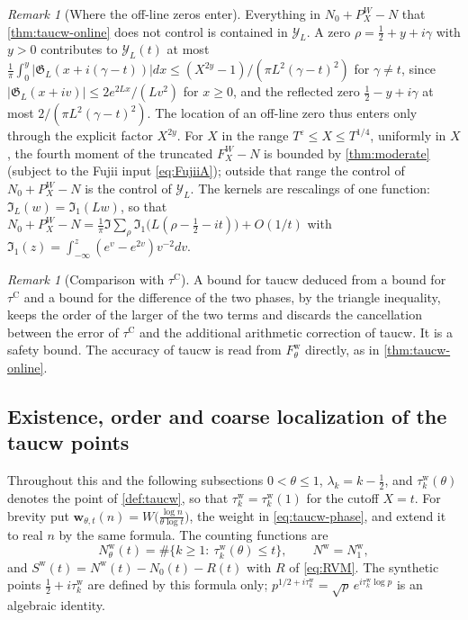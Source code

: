 \documentclass[11pt,a4paper]{article}
\numberwithin{equation}{section}
\theoremstyle{definition}
\theoremstyle{remark}
\newtheorem{remark}[theorem]{Remark}
\begin{document}
\begin{remark}[Where the off-line zeros enter]\label{rem:taucw-off}
Everything in $N_0+P^W_X-N$ that \cref{thm:taucw-online} does not control is contained in $\mathcal Y_L$. A zero $\rho=\frac12+y+i\gamma$ with $y>0$ contributes to $\mathcal Y_L(t)$ at most $\frac1\pi\int_0^y|\mathfrak G_L(x+i(\gamma-t))|dx\le(X^{2y}-1)/(\pi L^2(\gamma-t)^2)$ for $\gamma\ne t$, since $|\mathfrak G_L(x+iv)|\le2e^{2Lx}/(Lv^2)$ for $x\ge0$, and the reflected zero $\frac12-y+i\gamma$ at most $2/(\pi L^2(\gamma-t)^2)$. The location of an off-line zero thus enters only through the explicit factor $X^{2y}$. For $X$ in the range $T^\varepsilon\le X\le T^{1/4}$, uniformly in $X$, the fourth moment of the truncated $F_X^W-N$ is bounded by \cref{thm:moderate} (subject to the Fujii input \eqref{eq:FujiiA}); outside that range the control of $N_0+P^W_X-N$ is the control of $\mathcal Y_L$. The kernels are rescalings of one function: $\mathfrak I_L(w)=\mathfrak I_1(Lw)$, so that $N_0+P^W_X-N=\frac1\pi\Im\sum_\rho\mathfrak I_1\bigl(L(\rho-\frac12-it)\bigr)+O(1/t)$ with $\mathfrak I_1(z)=\int_{-\infty}^z(e^v-e^{2v})v^{-2}dv$.
\end{remark}

\begin{remark}[Comparison with $\tau^{\mathrm C}$]\label{rem:taucw-tauc}
A bound for taucw deduced from a bound for $\tau^{\mathrm C}$ and a bound for the difference of the two phases, by the triangle inequality, keeps the order of the larger of the two terms and discards the cancellation between the error of $\tau^{\mathrm C}$ and the additional arithmetic correction of taucw. It is a safety bound. The accuracy of taucw is read from $F^{\mathrm w}_\theta$ directly, as in \cref{thm:taucw-online}.
\end{remark}

\subsection{Existence, order and coarse localization of the taucw points}\label{sec:taucw-exist}
Throughout this and the following subsections $0<\theta\le1$, $\lambda_k=k-\frac12$, and $\tau_k^{\mathrm w}(\theta)$ denotes the point of \cref{def:taucw}, so that $\tau_k^{\mathrm w}=\tau_k^{\mathrm w}(1)$ for the cutoff $X=t$. For brevity put $\mathbf w_{\theta,t}(n)=W\bigl(\frac{\log n}{\theta\log t}\bigr)$, the weight in \eqref{eq:taucw-phase}, and extend it to real $n$ by the same formula. The counting functions are
\begin{equation}\label{eq:taucw-count}
N^{\mathrm w}_\theta(t)=\#\{k\ge1:\ \tau_k^{\mathrm w}(\theta)\le t\},\qquad N^{\mathrm w}=N^{\mathrm w}_1,
\end{equation}
and $S^{\mathrm w}(t)=N^{\mathrm w}(t)-N_0(t)-R(t)$ with $R$ of \eqref{eq:RVM}. The synthetic points $\frac12+i\tau_k^{\mathrm w}$ are defined by this formula only; $p^{1/2+i\tau_k^{\mathrm w}}=\sqrt p\,e^{i\tau_k^{\mathrm w}\log p}$ is an algebraic identity.
\end{document}

